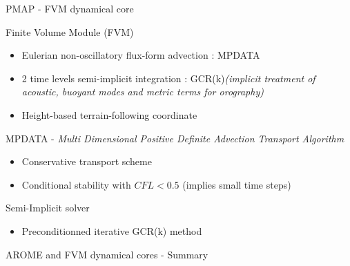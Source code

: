 \documentclass[10pt]{beamer}
\begin{document}
\begin{frame}{PMAP - FVM dynamical core}
    \begin{block}{Finite Volume Module (FVM)}
        \begin{itemize}
            \item Eulerian non-oscillatory flux-form advection : MPDATA
            \item 2 time levels semi-implicit integration : GCR(k)\newline\tiny \textit{(implicit treatment of acoustic, 
            buoyant modes and metric terms for orography)}
            \normalsize \item Height-based terrain-following coordinate
        \end{itemize}
    \end{block}

    \begin{block}{MPDATA -  \scriptsize \textit{Multi Dimensional Positive Definite Advection Transport Algorithm}}
        \begin{itemize}
            \item Conservative transport scheme
            \item Conditional stability with $CFL < 0.5$ (implies small time steps)
        \end{itemize}
    \end{block}

    \begin{block}{Semi-Implicit solver}
        \begin{itemize}
            \item Preconditionned iterative GCR(k) method
        \end{itemize}

    \end{block}
\end{frame}

\begin{frame}{AROME and FVM dynamical cores - Summary}
    \begin{center}
    \end{center}
\end{frame}
\end{document}

